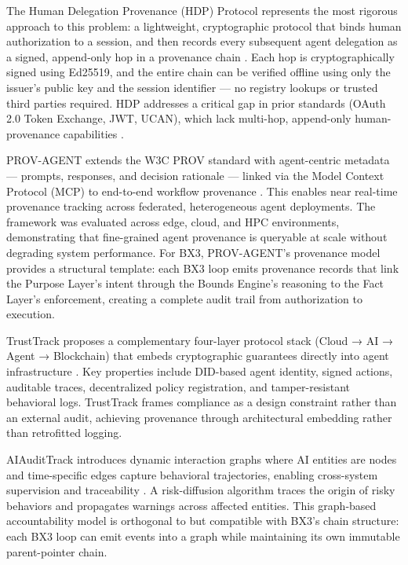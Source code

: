 The Human Delegation Provenance (HDP) Protocol represents the most rigorous approach to this problem: a lightweight, cryptographic protocol that binds human authorization to a session, and then records every subsequent agent delegation as a signed, append-only hop in a provenance chain \cite{hdp2026, hdp2025ietf}. Each hop is cryptographically signed using Ed25519, and the entire chain can be verified offline using only the issuer's public key and the session identifier — no registry lookups or trusted third parties required. HDP addresses a critical gap in prior standards (OAuth 2.0 Token Exchange, JWT, UCAN), which lack multi-hop, append-only human-provenance capabilities \cite{hdp2025arxiv}.

PROV-AGENT extends the W3C PROV standard with agent-centric metadata — prompts, responses, and decision rationale — linked via the Model Context Protocol (MCP) to end-to-end workflow provenance \cite{provcagent2025}. This enables near real-time provenance tracking across federated, heterogeneous agent deployments. The framework was evaluated across edge, cloud, and HPC environments, demonstrating that fine-grained agent provenance is queryable at scale without degrading system performance. For BX3, PROV-AGENT's provenance model provides a structural template: each BX3 loop emits provenance records that link the Purpose Layer's intent through the Bounds Engine's reasoning to the Fact Layer's enforcement, creating a complete audit trail from authorization to execution.

TrustTrack proposes a complementary four-layer protocol stack (Cloud → AI → Agent → Blockchain) that embeds cryptographic guarantees directly into agent infrastructure \cite{trusttrack2025}. Key properties include DID-based agent identity, signed actions, auditable traces, decentralized policy registration, and tamper-resistant behavioral logs. TrustTrack frames compliance as a design constraint rather than an external audit, achieving provenance through architectural embedding rather than retrofitted logging.

AIAuditTrack introduces dynamic interaction graphs where AI entities are nodes and time-specific edges capture behavioral trajectories, enabling cross-system supervision and traceability \cite{aaudittrack2025}. A risk-diffusion algorithm traces the origin of risky behaviors and propagates warnings across affected entities. This graph-based accountability model is orthogonal to but compatible with BX3's chain structure: each BX3 loop can emit events into a graph while maintaining its own immutable parent-pointer chain.

